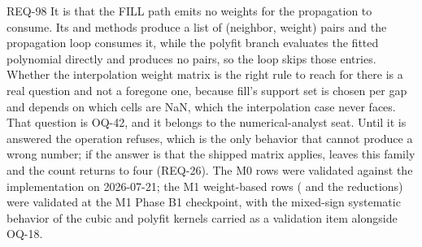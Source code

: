 \begin{reqbox}{REQ-98}{\stable}
It is that the FILL path emits no weights for the propagation to
consume. Its  and  methods produce a list
of (neighbor, weight) pairs and the propagation loop consumes it, while
the polyfit branch evaluates the fitted polynomial directly and produces
no pairs, so the loop skips those entries. Whether the interpolation
weight matrix is the right rule to reach for there is a real question
and not a foregone one, because fill's support set is chosen per gap and
depends on which cells are NaN, which the interpolation case never faces.
That question is OQ-42, and it belongs to the numerical-analyst seat.
Until it is answered the operation refuses, which is the only behavior
that cannot produce a wrong number; if the answer is that the shipped
matrix applies,  leaves this family and the
count returns to four (REQ-26). The M0 rows
were validated against the
implementation on 2026-07-21; the M1 weight-based rows
( and the reductions) were validated at the M1
Phase B1 checkpoint, with the mixed-sign systematic behavior of the
cubic and polyfit kernels carried as a validation item alongside
OQ-18.


\end{reqbox}
